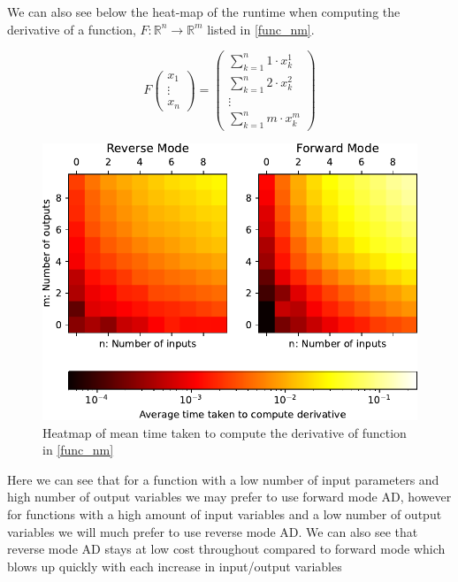 \documentclass{article}
\begin{document}
We can also see below the heat-map of the runtime when computing the derivative of a function, $F: \mathbb{R}^n \rightarrow \mathbb{R}^m$ listed in \eqref{func_nm}.

\begin{equation}
    F \begin{pmatrix}
        x_1 \\ \vdots \\ x_n
    \end{pmatrix} = \begin{pmatrix}
        \sum_{k=1}^n 1 \cdot x_k^1 \\ \sum_{k=1}^n 2 \cdot x_{k}^{2} \\ \vdots \\ \sum_{k=1}^n m \cdot x_{k}^{m}
    \end{pmatrix}
    \label{func_nm}
\end{equation}


\begin{figure}[h]
    \centering
    \includegraphics{images/Graph_HeatmapTimeDiff.pdf}
    \caption{Heatmap of mean time taken to compute the derivative of function in \eqref{func_nm}}
    \label{fig:heatmap}
\end{figure}

Here we can see that for a function with a low number of input parameters and high number of output variables we may prefer to use forward mode AD, however for functions with a high amount of input variables and a low number of output variables we will much prefer to use reverse mode AD. We can also see that reverse mode AD stays at low cost throughout compared to forward mode which blows up quickly with each increase in input/output variables
\end{document}
